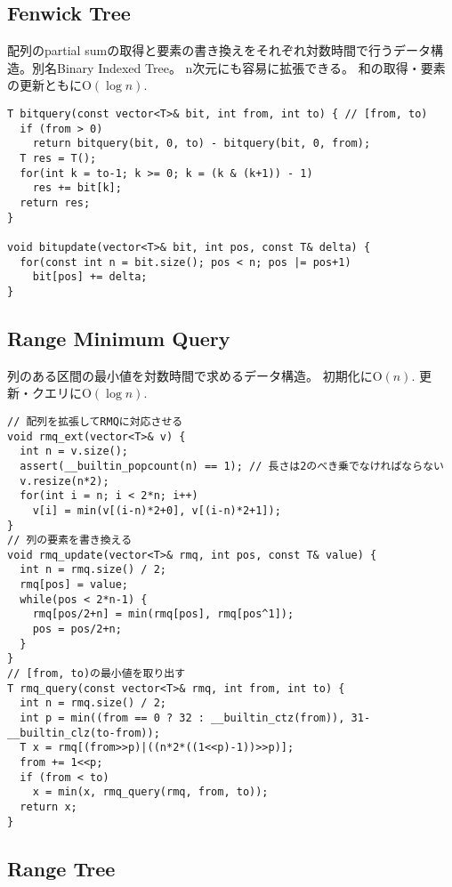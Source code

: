 \subsection{Fenwick Tree}

配列のpartial sumの取得と要素の書き換えをそれぞれ対数時間で行うデータ構造。別名Binary Indexed Tree。
n次元にも容易に拡張できる。
和の取得・要素の更新ともに$\mathrm{O}(\log n)$.

\begin{lstlisting}
T bitquery(const vector<T>& bit, int from, int to) { // [from, to)
  if (from > 0)
    return bitquery(bit, 0, to) - bitquery(bit, 0, from);
  T res = T();
  for(int k = to-1; k >= 0; k = (k & (k+1)) - 1)
    res += bit[k];
  return res;
}

void bitupdate(vector<T>& bit, int pos, const T& delta) {
  for(const int n = bit.size(); pos < n; pos |= pos+1)
    bit[pos] += delta;
}
\end{lstlisting}

\subsection{Range Minimum Query}

列のある区間の最小値を対数時間で求めるデータ構造。
初期化に$\mathrm{O}(n)$. 更新・クエリに$\mathrm{O}(\log n)$.

\begin{lstlisting}
// 配列を拡張してRMQに対応させる
void rmq_ext(vector<T>& v) {
  int n = v.size();
  assert(__builtin_popcount(n) == 1); // 長さは2のべき乗でなければならない
  v.resize(n*2);
  for(int i = n; i < 2*n; i++)
    v[i] = min(v[(i-n)*2+0], v[(i-n)*2+1]);
}
// 列の要素を書き換える
void rmq_update(vector<T>& rmq, int pos, const T& value) {
  int n = rmq.size() / 2;
  rmq[pos] = value;
  while(pos < 2*n-1) {
    rmq[pos/2+n] = min(rmq[pos], rmq[pos^1]);
    pos = pos/2+n;
  }
}
// [from, to)の最小値を取り出す
T rmq_query(const vector<T>& rmq, int from, int to) {
  int n = rmq.size() / 2;
  int p = min((from == 0 ? 32 : __builtin_ctz(from)), 31-__builtin_clz(to-from));
  T x = rmq[(from>>p)|((n*2*((1<<p)-1))>>p)];
  from += 1<<p;
  if (from < to)
    x = min(x, rmq_query(rmq, from, to));
  return x;
}
\end{lstlisting}


\subsection{Range Tree}

